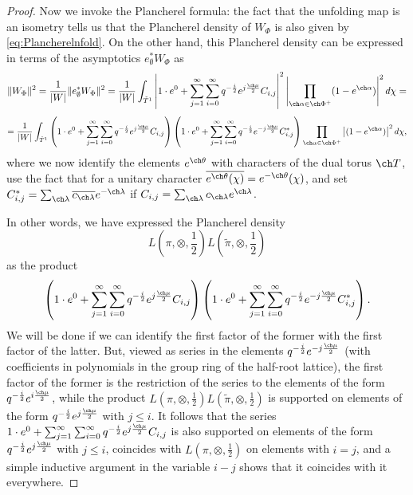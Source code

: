 \documentclass[final]{amsart}
\theoremstyle{remark}
\theoremstyle{definition}
\numberwithin{equation}{section}
\begin{document}
\begin{proof}
Now we invoke the Plancherel formula: the fact that the unfolding map is an isometry tells us that the Plancherel density of $W_{\Phi}$ is also given by \eqref{eq:Plancherelnfold}. On the other hand, this Plancherel density can be expressed in terms of the asymptotics
$e_\emptyset^* W_{\Phi}$ as 
\[ \Vert W_{\Phi}\Vert^2 = \frac{1}{|W|} \Vert e_\emptyset^* W_{\Phi}\Vert^2 = \frac{1}{|W|} \int_{\check T^1} 
\left|1\cdot e^0 + \sum_{j=1}^\infty \sum_{i=0}^\infty q^{-\frac{i}{2}} e^{j\frac{\ch\mu}{2}} C_{i,j}\right|^2 \left| \prod_{\ch\alpha \in \ch\Phi^+} (1-e^{\ch\alpha})\right|^2 d\chi = \]
\[ = \frac{1}{|W|} \int_{\check T^1} 
\left(1\cdot e^0 + \sum_{j=1}^\infty \sum_{i=0}^\infty q^{-\frac{i}{2}} e^{j\frac{\ch\mu}{2}} C_{i,j}\right) \left(1\cdot e^0 + \sum_{j=1}^\infty \sum_{i=0}^\infty q^{-\frac{i}{2}} e^{-j\frac{\ch\mu}{2}} C^*_{i,j}\right) \prod_{\ch\alpha \in \ch\Phi^+} \left|(1-e^{\ch\alpha})\right|^2 d\chi,\]
where we now identify the elements $e^{\ch\theta}$ with characters of the dual torus $\ch T$, use the fact that for a unitary character $\overline{e^{\ch\theta}(\chi)} = e^{-\ch\theta}(\chi)$, and set $C^*_{i,j} = \sum_{\ch\lambda} \overline{c_{\ch\lambda}} e^{-\ch\lambda}$ if $C_{i,j} = \sum_{\ch\lambda} c_{\ch\lambda} e^{\ch\lambda} $. 

In other words, we have expressed the Plancherel density 
\[ 
 L(\pi, \otimes, \frac{1}{2}) L(\tilde \pi, \otimes, \frac{1}{2})
\]
as the product 
\[
 \left(1\cdot e^0 + \sum_{j=1}^\infty \sum_{i=0}^\infty q^{-\frac{i}{2}} e^{j\frac{\ch\mu}{2}} C_{i,j}\right) \left(1\cdot e^0 + \sum_{j=1}^\infty \sum_{i=0}^\infty q^{-\frac{i}{2}} e^{-j\frac{\ch\mu}{2}} C^*_{i,j}\right). 
\]
We will be done if we can identify the first factor of the former with the first factor of the latter. But, viewed as series in the elements $q^{-\frac{i}{2}} e^{-j\frac{\ch\mu}{2}}$ (with coefficients in polynomials in the group ring of the half-root lattice), the first factor of the former is the restriction of the series to the elements of the form $q^{-\frac{i}{2}} e^{i\frac{\ch\mu}{2}}$, while the product 
$ L(\pi, \otimes, \frac{1}{2}) L(\tilde \pi, \otimes, \frac{1}{2})$ is supported on elements of the form $q^{-\frac{i}{2}} e^{j\frac{\ch\mu}{2}}$ with $j\le i$. It follows that the series $ 1\cdot e^0 + \sum_{j=1}^\infty \sum_{i=0}^\infty q^{-\frac{i}{2}} e^{j\frac{\ch\mu}{2}} C_{i,j}$ is also supported on elements of the form $q^{-\frac{i}{2}} e^{j\frac{\ch\mu}{2}}$ with $j \le i$, coincides with $L(\pi, \otimes, \frac{1}{2})$ on elements with $i=j$, and a simple inductive argument in the variable $i-j$ shows that it coincides with it everywhere.
\end{proof}
 
\end{document}
